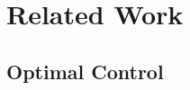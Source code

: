 
\section{Related Work}
\label{sec:related_work}

\subsection{}
\label{ssec:sota_vin}

\subsection{Optimal Control}
\label{ssec:sota_optimal_control}